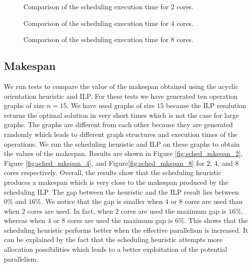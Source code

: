 \begin{figure}[phbt]
\centering

\caption{Comparison of the scheduling execution time for $2$ cores.}
\label{fig:sched_exec_2}
\end{figure}

\begin{figure}[phbt]
\centering

\caption{Comparison of the scheduling execution time for $4$ cores.}
\label{fig:sched_exec_4}
\end{figure}

\begin{figure}[phbt]
\centering

\caption{Comparison of the scheduling execution time for $8$ cores.}
\label{fig:sched_exec_8}
\end{figure}

\subsection{Makespan}

We run tests to compare the value of the makespan obtained using the acyclic orientation heuristic and ILP. For these tests we have generated ten operation graphs of size $n = 15$. We have used graphs of size $15$ because the ILP resolution returns the optimal solution in very short times which is not the case for large graphs. The graphs are different from each other because they are generated randomly which leads to different graph structures and execution times of the operations. We run the scheduling heuristic and ILP on these graphs to obtain the values of the makespan. Results are shown in Figure \ref{fig:sched_mkspan_2}, Figure \ref{fig:sched_mkspan_4}, and Figure\ref{fig:sched_mkspan_8} for $2$, $4$, and $8$ cores respectively. Overall, the results show that the scheduling heuristic produces a makespan which is very close to the makespan produced by the scheduling ILP. The gap between the heuristic and the ILP result lies between $0\%$ and $16\%$. We notice that the gap is smaller when $4$ or $8$ cores are used than when $2$ cores are used. In fact, when $2$ cores are used the maximum gap is $16\%$, whereas when $4$ or $8$ cores are used the maximum gap is $6\%$. This shows that the scheduling heuristic performs better when the effective parallelism is increased. It can be explained by the fact that the scheduling heuristic attempts more allocation possibilities which leads to a better exploitation of the potential parallelism.

